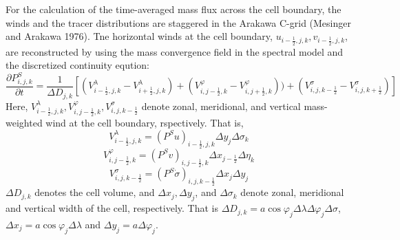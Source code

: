 For the calculation of the time-averaged mass flux across the cell boundary, the winds and the tracer distributions are staggered in the Arakawa C-grid (Mesinger and Arakawa 1976). Tne horizontal winds at the cell boundary, $u_{i-\frac{1}{2},j,k}, v_{i-\frac{1}{2},j,k}$, are reconstructed by using the mass convergence field in the spectral model and the discretized continuity eqution: 
\begin{equation}
  \frac{\partial P^{S}_{i,j,k} }{\partial t}=\frac{1}{\Delta D_{j,k}}[(V^{\lambda}_{i-\frac{1}{2},j,k}-V^{\lambda}_{i+\frac{1}{2},j,k})+(V^{\varphi}_{i,j-\frac{1}{2},k}-V^{\varphi}_{i,j+\frac{1}{2},k}))+(V^{\sigma}_{i,j,k-\frac{1}{2}}-V^{\sigma}_{i,j,k+\frac{1}{2}})]
\end{equation}
Here, $V^{\lambda}_{i-\frac{1}{2},j,k}, V^{\varphi}_{i,j-\frac{1}{2},k}, V^{\sigma}_{i,j,k-\frac{1}{2}}$ denote zonal, meridional, and vertical mass-weighted wind at the cell boundary, rspectively. That is, 
\begin{equation}
  V^{\lambda}_{i-\frac{1}{2},j,k}=(P^{S}u)_{i-\frac{1}{2},j,k} \Delta y_{j} \Delta \sigma_{k}
\end{equation}
\begin{equation}
  V^{\varphi}_{i,j-\frac{1}{2},k}=(P^{S}v)_{i,j-\frac{1}{2},k} \Delta x_{j-\frac{1}{2}} \Delta \eta_{k}
\end{equation}
\begin{equation}
  V^{\sigma}_{i,j,k-\frac{1}{2}}=(P^{S}\dot{\sigma})_{i,j,k-\frac{1}{2}} \Delta x_{j} \Delta y_{j}
\end{equation}
$\Delta D_{j,k}$ denotes the cell volume, and $\Delta x_{j}, \Delta y_{j}$, and $\Delta \sigma_{k}$ denote zonal, meridional and vertical width of the cell, respectively. That is $\Delta D_{j,k}=a \cos \varphi_{j}\Delta \lambda \Delta \varphi_{j} \Delta \sigma$, $\Delta x_{j}=a \cos \varphi_{j} \Delta \lambda$ and $\Delta y_{j}=a \Delta \varphi_{j}$.

